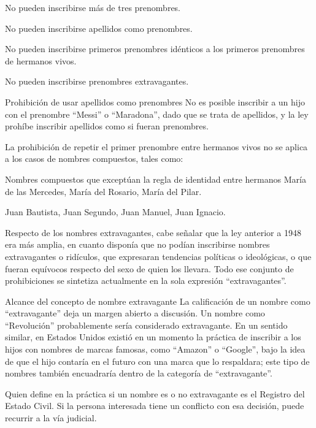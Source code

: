 \documentclass[12pt,oneside]{book}
\begin{document}
\begin{important}
No pueden inscribirse más de tres prenombres.

No pueden inscribirse apellidos como prenombres.

No pueden inscribirse primeros prenombres idénticos a los primeros prenombres de hermanos vivos.

No pueden inscribirse prenombres extravagantes.
\end{important}

\begin{example}{Prohibición de usar apellidos como prenombres}
No es posible inscribir a un hijo con el prenombre ``Messi'' o ``Maradona'', dado que se trata de apellidos, y la ley prohíbe inscribir apellidos como si fueran prenombres.
\end{example}

La prohibición de repetir el primer prenombre entre hermanos vivos no se aplica a los casos de nombres compuestos, tales como:

\begin{example}{Nombres compuestos que exceptúan la regla de identidad entre hermanos}
María de las Mercedes, María del Rosario, María del Pilar.

Juan Bautista, Juan Segundo, Juan Manuel, Juan Ignacio.
\end{example}

Respecto de los nombres extravagantes, cabe señalar que la ley anterior a 1948 era más amplia, en cuanto disponía que no podían inscribirse nombres extravagantes o ridículos, que expresaran tendencias políticas o ideológicas, o que fueran equívocos respecto del sexo de quien los llevara. Todo ese conjunto de prohibiciones se sintetiza actualmente en la sola expresión ``extravagantes''.

\begin{example}{Alcance del concepto de nombre extravagante}
La calificación de un nombre como ``extravagante'' deja un margen abierto a discusión. Un nombre como ``Revolución'' probablemente sería considerado extravagante. En un sentido similar, en Estados Unidos existió en un momento la práctica de inscribir a los hijos con nombres de marcas famosas, como ``Amazon'' o ``Google'', bajo la idea de que el hijo contaría en el futuro con una marca que lo respaldara; este tipo de nombres también encuadraría dentro de la categoría de ``extravagante''.
\end{example}

\begin{note}
Quien define en la práctica si un nombre es o no extravagante es el Registro del Estado Civil. Si la persona interesada tiene un conflicto con esa decisión, puede recurrir a la vía judicial.
\end{note}
\end{document}
